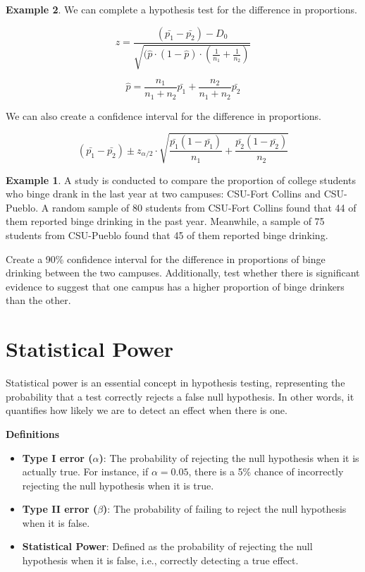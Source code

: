 \documentclass[
  11pt,
  oneside]{book}
\theoremstyle{definition}
\theoremstyle{definition}
\newtheorem{example}{Example}[chapter]
\theoremstyle{definition}
\theoremstyle{definition}
\theoremstyle{remark}
\begin{document}
\begin{example}
We can complete a hypothesis test for the difference in proportions.

\[z = \frac{(\bar{p_1}-\bar{p_2})-D_0}{\sqrt{(\hat{p}\cdot (1-\hat{p})\cdot(\frac{1}{n_1} + \frac{1}{n_2})}}\]

\[\hat{p} = \frac{n_1}{n_1+n_2} \bar{p_1} + \frac{n_2}{n_1+n_2} \bar{p_2}\]

We can also create a confidence interval for the difference in proportions.

\[(\bar{p_1}-\bar{p_2}) \pm z_{\alpha/2} \cdot \sqrt{\frac{\bar{p_1}(1-\bar{p_1})}{n_1} + \frac{\bar{p_2}(1-\bar{p_2})}{n_2}}\]

\begin{example}
A study is conducted to compare the proportion of college students who binge drank in the last year at two campuses: CSU-Fort Collins and CSU-Pueblo. A random sample of 80 students from CSU-Fort Collins found that 44 of them reported binge drinking in the past year. Meanwhile, a sample of 75 students from CSU-Pueblo found that 45 of them reported binge drinking.

Create a 90\% confidence interval for the difference in proportions of binge drinking between the two campuses. Additionally, test whether there is significant evidence to suggest that one campus has a higher proportion of binge drinkers than the other.
\end{example}

\vfill

\newpage

\section{Statistical Power}\label{statistical-power}

Statistical power is an essential concept in hypothesis testing, representing the probability that a test correctly rejects a false null hypothesis. In other words, it quantifies how likely we are to detect an effect when there is one.

\textbf{Definitions}

\begin{itemize}
\item
  \textbf{Type I error (\(\alpha\))}: The probability of rejecting the null hypothesis when it is actually true. For instance, if \(\alpha = 0.05\), there is a 5\% chance of incorrectly rejecting the null hypothesis when it is true.
\item
  \textbf{Type II error (\(\beta\))}: The probability of failing to reject the null hypothesis when it is false.
\item
  \textbf{Statistical Power}: Defined as the probability of rejecting the null hypothesis when it is false, i.e., correctly detecting a true effect.


\end{itemize}
\end{example}
\end{document}
